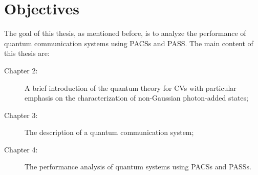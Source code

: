     \section{Objectives}
        The goal of this thesis, as mentioned before, is to analyze the performance of quantum 
        communication systems using PACSs and PASS. The main content of this thesis are:
        \begin{description}
            \item[Chapter 2:] A brief introduction of the quantum theory for CVs with particular emphasis on
                    the characterization of non-Gaussian photon-added states;
            \item[Chapter 3:] The description of a quantum communication system;
            \item[Chapter 4:] The performance analysis of quantum systems using PACSs and PASSs.
        \end{description}